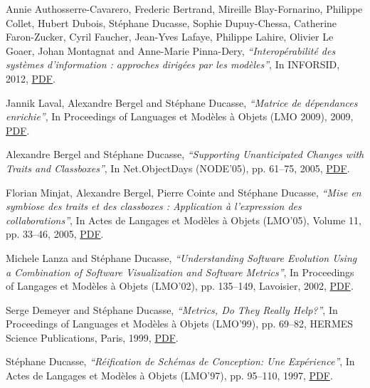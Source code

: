 \documentclass{article}
\newcommand{\czauthors}[1]{#1}
\newcommand{\cztitle}[1]{\emph{``#1''}}
\newcommand{\czbooktitle}[1]{#1}
\begin{document}
\begin{itemize}

	\pub  \czauthors{Annie Authosserre-Cavarero, Frederic Bertrand, Mireille Blay-Fornarino, Philippe Collet, Hubert Dubois, St\'ephane Ducasse, Sophie Dupuy-Chessa, Catherine Faron-Zucker, Cyril Faucher, Jean-Yves Lafaye, Philippe Lahire, Olivier Le Goaer, Johan Montagnat and Anne-Marie Pinna-Dery},  \cztitle{Interop\'erabilit\'e des syst\`emes d'information : approches dirig\'ees par les mod\`eles},  In \czbooktitle{INFORSID}, 2012, \href{http://rmod-files.lille.inria.fr/Team/Texts/Papers/Auth12a-interop-si-2012.pdf}{PDF}.

	\pub  \czauthors{Jannik Laval, Alexandre Bergel and St\'ephane Ducasse},  \cztitle{Matrice de d\'ependances enrichie},  In \czbooktitle{Proceedings of Languages et Mod\`eles \`a Objets (LMO 2009)}, 2009, \href{http://rmod-files.lille.inria.fr/Team/Texts/Papers/Lava09a-LMO2009-DSM.pdf}{PDF}.

	\pub  \czauthors{Alexandre Bergel and St\'ephane Ducasse},  \cztitle{Supporting Unanticipated Changes with {Traits} and {Classboxes}},  In \czbooktitle{{Net}.{ObjectDays} (NODE'05)}, pp. 61--75, 2005, \href{http://rmod-files.lille.inria.fr/Team/Texts/Papers/Berg05dTraitsClassbox.pdf}{PDF}.

	\pub  \czauthors{Florian Minjat, Alexandre Bergel, Pierre Cointe and St\'ephane Ducasse},  \cztitle{Mise en symbiose des traits et des classboxes : Application \`a l'expression des collaborations},  In \czbooktitle{Actes de Langages et Mod\`eles \`a Objets (LMO'05)}, Volume 11, pp. 33--46, 2005, \href{http://rmod-files.lille.inria.fr/Team/Texts/Papers/Minj05a-TraitClassbox.pdf}{PDF}.

	\pub  \czauthors{Michele Lanza and St\'ephane Ducasse},  \cztitle{Understanding Software Evolution Using a Combination of Software Visualization and Software Metrics},  In \czbooktitle{Proceedings of Langages et Mod\`eles \`a Objets (LMO'02)}, pp. 135--149, Lavoisier, 2002, \href{http://rmod-files.lille.inria.fr/Team/Texts/Papers/Lanz02aEvolutionMatrix.pdf}{PDF}.

	\pub  \czauthors{Serge Demeyer and St\'ephane Ducasse},  \cztitle{Metrics, Do They Really Help?},  In \czbooktitle{Proceedings of Languages et Mod\`eles \`a Objets (LMO'99)}, pp. 69--82, HERMES Science Publications, Paris, 1999, \href{http://rmod-files.lille.inria.fr/Team/Texts/Papers/Deme99a-LMO99-DemeyerDucasse.pdf}{PDF}.

	\pub  \czauthors{St\'ephane Ducasse},  \cztitle{R\'eification de Sch\'emas de Conception: Une Exp\'erience},  In \czbooktitle{Actes de Langages et Mod\`eles \`a Objets (LMO'97)}, pp. 95--110, 1997, \href{http://rmod-files.lille.inria.fr/Team/Texts/Papers/Duca97dReificationDP.ps.gz}{PDF}.


\end{itemize}
\end{document}
